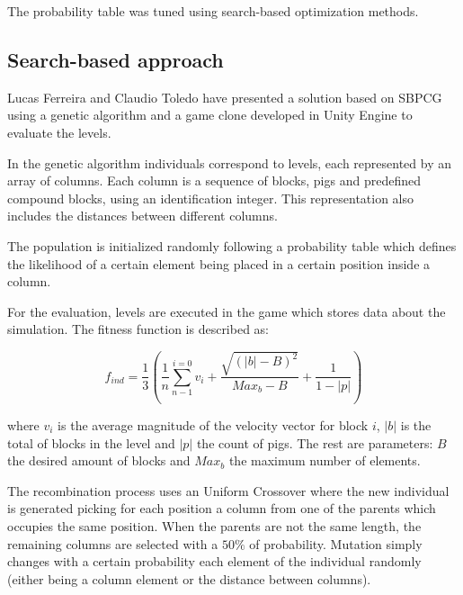 The probability table was tuned using search-based optimization methods.

\subsection{Search-based approach}

Lucas Ferreira and Claudio Toledo\cite{ferreira2014search} have
presented a solution based on SBPCG using a genetic algorithm and a
game clone developed in Unity Engine to evaluate the levels. 

In the genetic algorithm individuals correspond to levels, each represented by an array of columns. Each column is a sequence of blocks, pigs and predefined compound blocks, using an identification integer. This representation also includes the distances between different columns.

The population is initialized randomly following a probability table which defines the likelihood of a certain element being placed in a certain position inside a column.

For the evaluation, levels are executed in the game which stores data about the simulation. The fitness function is described as:

$$ f_{ind} = \frac{1}{3}(\frac{1}{n} \sum_{n-1}^{i=0}{v_i}+\frac{\sqrt{(|b|-B)^2}}{Max_b-B}+ \frac{1}{1-|p|})$$ 

where $v_i$ is the average magnitude of the velocity vector for block $i$, $|b|$ is the total of blocks in the level and $|p|$ the count of pigs. The rest are parameters: $B$ the desired amount of blocks and $Max_b$ the maximum number of elements.

The recombination process uses an Uniform Crossover where the new individual is generated picking for each position a column from one of the parents which occupies the same position. When the parents are not the same length, the remaining columns are selected with a $50\%$ of probability. Mutation simply changes with a certain probability each element of the individual randomly (either being a column element or the distance between columns).

